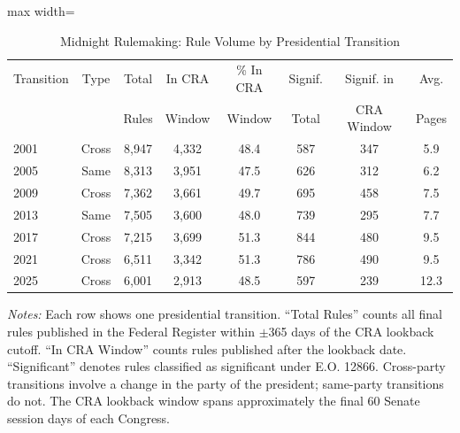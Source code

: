 \begin{table}[H]
\centering
\caption{Midnight Rulemaking: Rule Volume by Presidential Transition}
\label{tab:midnight}
\begin{threeparttable}
\begin{adjustbox}{max width=\textwidth}
\begin{tabular}{lccccccc}
\toprule
Transition & Type & Total & In CRA & \% In CRA & Signif. & Signif. in & Avg. \\
 & & Rules & Window & Window & Total & CRA Window & Pages \\
\midrule
2001 & Cross & 8,947 & 4,332 & 48.4 & 587 & 347 & 5.9 \\
2005 & Same & 8,313 & 3,951 & 47.5 & 626 & 312 & 6.2 \\
2009 & Cross & 7,362 & 3,661 & 49.7 & 695 & 458 & 7.5 \\
2013 & Same & 7,505 & 3,600 & 48.0 & 739 & 295 & 7.7 \\
2017 & Cross & 7,215 & 3,699 & 51.3 & 844 & 480 & 9.5 \\
2021 & Cross & 6,511 & 3,342 & 51.3 & 786 & 490 & 9.5 \\
2025 & Cross & 6,001 & 2,913 & 48.5 & 597 & 239 & 12.3 \\
\bottomrule
\end{tabular}
\end{adjustbox}
\begin{tablenotes}[flushleft]
\small
\item \textit{Notes:} Each row shows one presidential transition. ``Total Rules'' counts all final rules published in the Federal Register within $\pm$365 days of the CRA lookback cutoff. ``In CRA Window'' counts rules published after the lookback date. ``Significant'' denotes rules classified as significant under E.O. 12866. Cross-party transitions involve a change in the party of the president; same-party transitions do not. The CRA lookback window spans approximately the final 60 Senate session days of each Congress.
\end{tablenotes}
\end{threeparttable}
\end{table}
